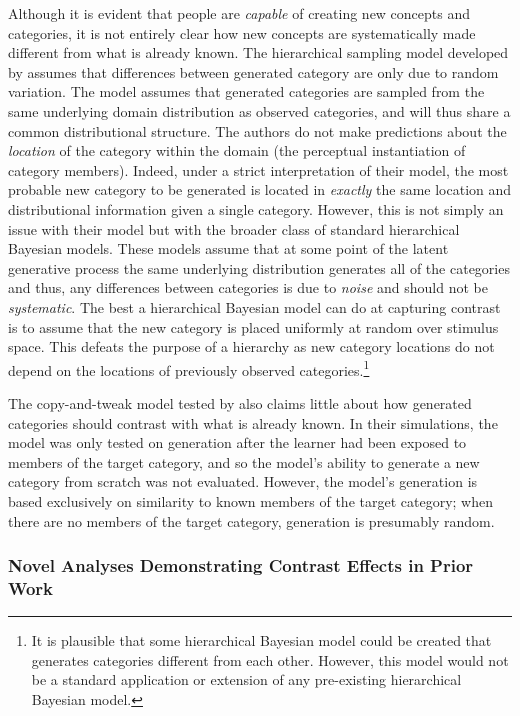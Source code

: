 \documentclass[12pt]{article}
\begin{document}
\begin{flushleft}
Although it is evident that people are {\em capable} of creating new concepts and categories, it is not entirely clear how new concepts are systematically made different from what is already known. The hierarchical sampling model developed by \cite{jern2013probabilistic} assumes that differences between generated category are only due to random variation. The model assumes that generated categories are sampled from the same underlying domain distribution as observed categories, and will thus share a common distributional structure. The authors do not make predictions about the {\em location} of the category within the domain (the perceptual instantiation of category members). Indeed, under a strict interpretation of their model, the most probable new category to be generated is located in {\em exactly} the same location and distributional information given a single category. However, this is not simply an issue with their model but with the broader class of standard hierarchical Bayesian models. These models assume that at some point of the latent generative process the same underlying distribution generates all of the categories and thus, any differences between categories is due to {\em noise} and should not be {\em systematic}. The best a hierarchical Bayesian model can do at capturing contrast is to assume that the new category is placed uniformly at random over stimulus space. This defeats the purpose of a hierarchy as new category locations do not depend on the locations of previously observed categories.\footnote{It is plausible that some hierarchical Bayesian model could be created that generates categories different from each other. However, this model would not be a standard application or extension of any pre-existing hierarchical Bayesian model.}

The copy-and-tweak model tested by \cite{jern2013probabilistic} also claims little about how generated categories should contrast with what is already known. In their simulations, the model was only tested on generation after the learner had been exposed to members of the target category, and so the model's ability to generate a new category from scratch was not evaluated. However, the model's generation is based exclusively on similarity to known members of the target category; when there are no members of the target category, generation is presumably random.

\subsubsection{Novel Analyses Demonstrating Contrast Effects in Prior Work}


\end{flushleft}
\end{document}
